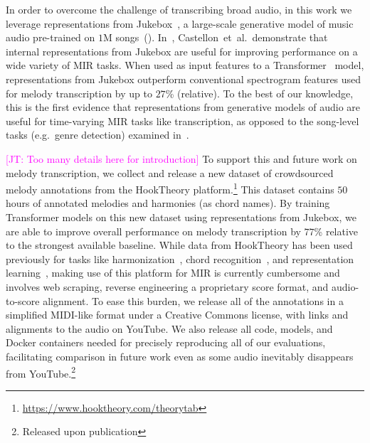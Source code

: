 \documentclass{article}
\newcommand{\hooktheory}{HookTheory}
\newcommand\john[1]{\textcolor{magenta}{[JT: #1]}}
\begin{document}
In order to overcome the challenge of transcribing broad audio, in this work we leverage representations from Jukebox~\cite{dhariwal2020jukebox}, a large-scale generative model of music audio pre-trained on $1$M songs~(). 
In~\cite{castellon2021calm}, Castellon~et~al.\ demonstrate that internal representations from Jukebox are useful for improving performance on a wide variety of MIR tasks. 
When used as input features to a Transformer~\cite{vaswani2017attention} model, representations from Jukebox outperform conventional spectrogram features used for melody transcription by 
up to $27$\% (relative). 
To the best of our knowledge, this is the first evidence that representations from generative models of audio are useful for time-varying MIR tasks like transcription, as opposed to the song-level tasks (e.g.~genre detection) examined in~\cite{castellon2021calm}. 

\john{Too many details here for introduction} To support this and future work on melody transcription, we collect and release a new dataset of crowdsourced melody annotations from the \hooktheory{} platform.\footnote{\url{https://www.hooktheory.com/theorytab}} 
This dataset contains $50$ hours of annotated melodies and harmonies (as chord names).  %
By training Transformer models on this new dataset using representations from Jukebox, we are able to improve overall performance on melody transcription by 
$77$\% 
relative to the strongest available baseline. 
While data from \hooktheory{} has been used previously for tasks like harmonization~\cite{chen2021surprisenet,yeh2021automatic}, chord recognition~\cite{jiang2019mirex}, and representation learning~\cite{jiang2020transformer}, making use of this platform for MIR is currently cumbersome and involves web scraping, reverse engineering a proprietary score format, and audio-to-score alignment. 
To ease this burden, we release all of the annotations in a simplified MIDI-like format under a Creative Commons license, with links and alignments to the audio on YouTube. 
We also release all code, models, and Docker containers needed for precisely reproducing all of our evaluations, facilitating comparison in future work even as some audio inevitably disappears from YouTube.\footnote{Released upon publication}
\end{document}
